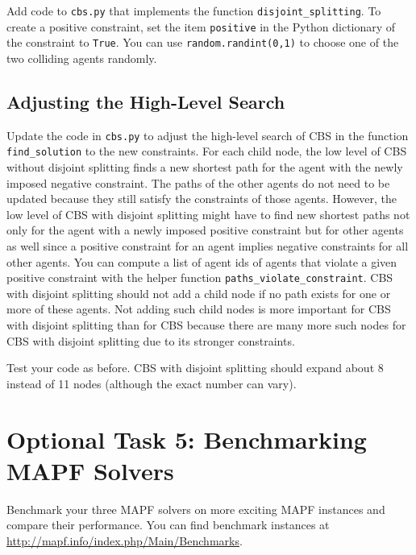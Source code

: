 \documentclass[11pt]{article}
\begin{document}
Add code to \texttt{cbs.py} that implements the function \texttt{disjoint_splitting}. To create a positive constraint, set the item \texttt{positive} in the Python dictionary of the constraint to \texttt{True}. You can use \texttt{random.randint(0,1)} to choose one of the two colliding agents randomly.

\subsection{Adjusting the High-Level Search}

Update the code in \texttt{cbs.py} to adjust the high-level search of CBS in the function \texttt{find_solution} to the new constraints. For each child node, the low level of CBS without disjoint splitting finds a new shortest path for the agent with the newly imposed negative constraint. The paths of the other agents do not need to be updated because they still satisfy the constraints of those agents. However, the low level of CBS with disjoint splitting might have to find new shortest paths not only for the agent with a newly imposed positive constraint but for other agents as well since a positive constraint for an agent implies negative constraints for all other agents. You can compute a list of agent ids of agents that violate a given positive constraint with the helper function \texttt{paths_violate_constraint}. CBS with disjoint splitting should not add a child node if no path exists for one or more of these agents. Not adding such child nodes is more important for CBS with disjoint splitting than for CBS because there are many more such nodes for CBS with disjoint splitting due to its stronger constraints.

Test your code as before. CBS with disjoint splitting should expand about 8 instead of 11 nodes (although the exact number can vary).

\section{Optional Task 5: Benchmarking MAPF Solvers}

Benchmark your three MAPF solvers on more exciting MAPF instances and compare their performance. You can find benchmark instances at \url{http://mapf.info/index.php/Main/Benchmarks}.



\end{document}
